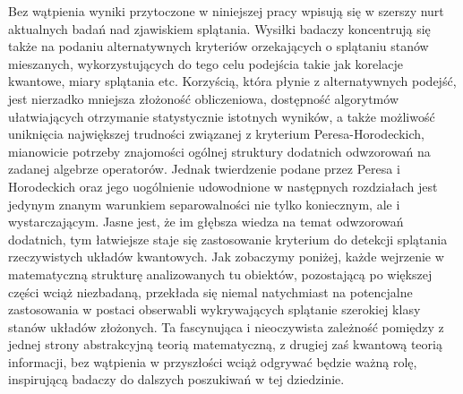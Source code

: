 Bez wątpienia wyniki przytoczone w niniejszej pracy wpisują się w szerszy nurt
aktualnych badań nad zjawiskiem splątania.
Wysiłki badaczy koncentrują się także na podaniu alternatywnych kryteriów
orzekających o splątaniu stanów mieszanych,
wykorzystujących do tego celu podejścia takie jak korelacje kwantowe,
miary splątania etc. 
Korzyścią, która płynie z alternatywnych podejść,
jest nierzadko mniejsza złożoność obliczeniowa,
dostępność algorytmów ułatwiających otrzymanie statystycznie istotnych wyników,
a także możliwość uniknięcia największej trudności związanej z kryterium
Peresa-Horodeckich,
mianowicie potrzeby znajomości ogólnej struktury dodatnich odwzorowań
na zadanej algebrze operatorów.
Jednak twierdzenie podane przez Peresa i Horodeckich oraz 
jego uogólnienie udowodnione w następnych rozdziałach
jest jedynym znanym warunkiem separowalności nie tylko koniecznym,
ale i wystarczającym.
Jasne jest,
że im głębsza wiedza na temat odwzorowań dodatnich,
tym łatwiejsze staje się zastosowanie kryterium do detekcji splątania
rzeczywistych układów kwantowych.
Jak zobaczymy poniżej,
każde wejrzenie w matematyczną strukturę analizowanych tu obiektów,
pozostającą po większej części wciąż niezbadaną,
przekłada się niemal natychmiast na potencjalne zastosowania w postaci
obserwabli wykrywających splątanie szerokiej klasy stanów układów złożonych.
Ta fascynująca i nieoczywista zależność pomiędzy z jednej strony abstrakcyjną
teorią matematyczną,
z drugiej zaś kwantową teorią informacji,
bez wątpienia w przyszłości wciąż odgrywać będzie ważną rolę,
inspirującą badaczy do dalszych poszukiwań w tej dziedzinie.


